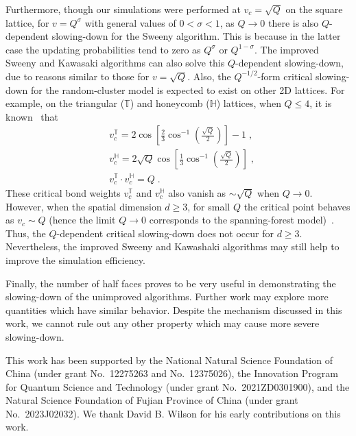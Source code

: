 \documentclass[aps,pre,twocolumn,superscriptaddress,longbibliography,floatfix]{revtex4-2}
\begin{document}
{Furthermore, though our simulations were performed at $v_c=\sqrt{Q}$ on the square lattice,
for $v=Q^{\sigma}$ with general values of $0 < \sigma <1$, as $Q \rightarrow 0$ there is also 
$Q$-dependent slowing-down for the Sweeny algorithm. This is because in the latter case the updating probabilities tend 
to zero as $Q^{\sigma}$ or $Q^{1-\sigma}$. The improved Sweeny and Kawasaki algorithms can also solve this $Q$-dependent
slowing-down, due to reasons similar to those for $v=\sqrt{Q}$.}
{Also, t}he $Q^{-1/2}$-form critical slowing-down for the random-cluster model is expected to exist on other 2D lattices.
For example, on the triangular ($\mathbb{T}$) and honeycomb ($\mathbb{H}$) lattices, 
when $Q \leq 4$, it is known~\cite{baxter1978triangular,wupotts,grimmett2006random} that 
\begin{align}
    &v^{\mathbb{T}}_c=2\cos[\frac{2}{3}\cos^{-1}(\frac{\sqrt{Q}}{2})]-1 \;,\\
    &v^{\mathbb{H}}_c=2\sqrt{Q}\cos[\frac{1}{3}\cos^{-1}(\frac{\sqrt{Q}}{2})] \;,\\
    &v^{\mathbb{T}}_c \cdot v^{\mathbb{H}}_c=Q \;.
\end{align}
These critical bond weights $v^{\mathbb{T}}_c$ and $v^{\mathbb{H}}_c$ also vanish as $\sim \sqrt{Q}$ when $Q \rightarrow 0$.
However, when the spatial dimension $d \geq 3$, for small $Q$ the critical point behaves as $v_c \sim Q$ (hence the limit $Q \to 0$ corresponds to the spanning-forest model)~\cite{deng2007ferromagnetic}. Thus, the $Q$-dependent critical slowing-down does not occur for $d \geq 3$. Nevertheless, the improved Sweeny and Kawashaki algorithms may still help to improve the simulation efficiency. 


{Finally, the number of half faces proves to be very useful in demonstrating the slowing-down of the unimproved algorithms. 
Further work may explore more quantities which have similar behavior. Despite the mechanism discussed in this work, 
we cannot rule out any other property which may cause more severe slowing-down.}

\begin{acknowledgments}
This work has been supported by the National Natural Science Foundation of China (under grant No.~12275263 and No.~12375026), the Innovation Program for Quantum Science and Technology (under grant No.~2021ZD0301900), and the Natural Science Foundation of Fujian Province of China (under grant No.~2023J02032). We thank David B. Wilson for his early contributions on this work.
\end{acknowledgments}
\end{document}
